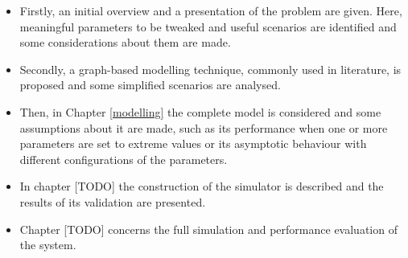 \begin{itemize}
    \item Firstly, an initial overview and a presentation of the problem are
    given. Here, meaningful parameters to be tweaked and useful scenarios are
    identified and some considerations about them are made.
    \item Secondly, a graph-based modelling technique, commonly used in
    literature, is proposed and some simplified scenarios are analysed.
    \item Then, in Chapter \ref{modelling} the complete model is considered and
    some assumptions about it are made, such as its performance when one or more
    parameters are set to extreme values or its asymptotic behaviour with
    different configurations of the parameters.
    \item In chapter [TODO] the construction of the simulator is described and
    the results of its validation are presented.
    \item Chapter [TODO] concerns the full simulation and performance evaluation
    of the system.
\end{itemize}
